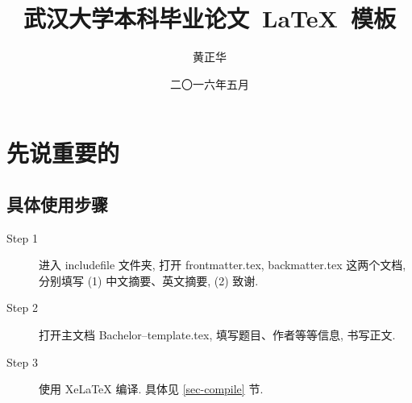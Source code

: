 \documentclass[forprint]{WHUBachelor}
\begin{document}

\miji{ }                                      %

\title{武汉大学本科毕业论文~\LaTeX~模板}
\author{黄正华}                            %
\date{二〇一六年五月}                    %

\maketitle
\frontmatter
{}              %
\tableofcontents
\mainmatter %
\chapter{先说重要的}
 
 \section{具体使用步骤}

 \begin{description}

  \item[Step 1]  进入 includefile 文件夹,  打开 frontmatter.tex, backmatter.tex 这两个文档,
        分别填写 (1) 中文摘要、英文摘要, (2) 致谢.

  \item[Step 2]  打开主文档 Bachelor--template.tex, 填写题目、作者等等信息, 书写正文.

  \item[Step 3]  使用 XeLaTeX 编译. 具体见 \ref{sec-compile} 节.


\end{description}
\end{document}
